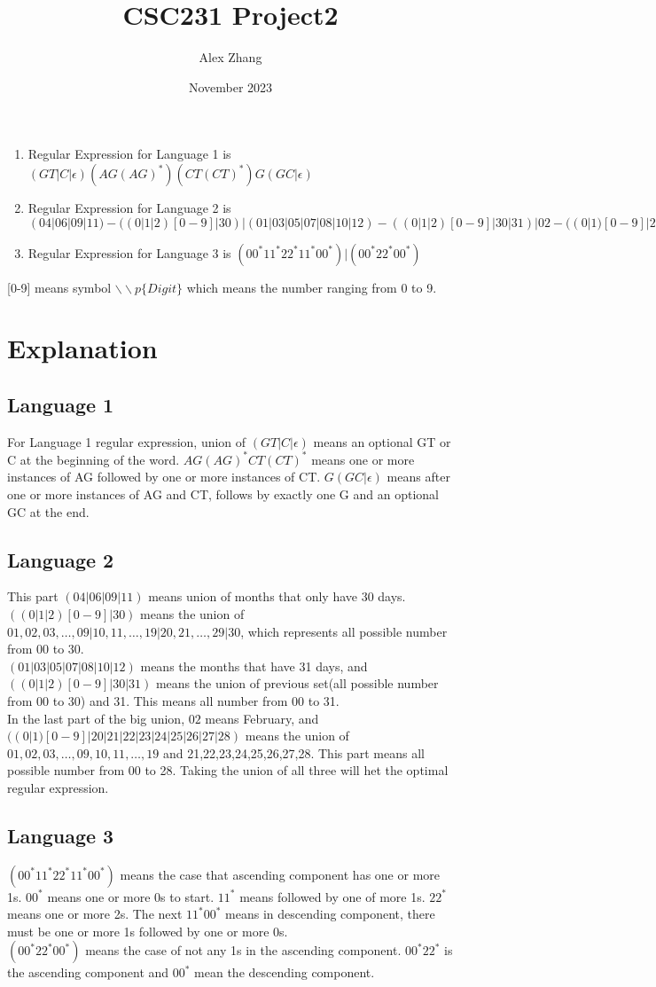 \documentclass{article}
\title{CSC231 Project2}
\author{Alex Zhang}
\date{November 2023}
\begin{document}
\maketitle
\begin{enumerate}
    \item Regular Expression for Language 1 is $(GT|C|\epsilon)(AG(AG)^*)(CT(CT)^*)G(GC|\epsilon)$
    \item Regular Expression for Language 2 is $(04|06|09|11)-((0|1|2)[0-9]|30)
    |(01|03|05|07|08|10|12)-((0|1|2)[0-9]|30|31)
    |02-((0|1)[0-9]|20|21|22|23|24|25|26|27|28)$
    \item Regular Expression for Language 3 is $(00^*11^*22^*11^*00^*)|(00^*22^*00^*)$
\end{enumerate}
[0-9] means symbol $\backslash\backslash p\{Digit\}$ which means the number ranging from 0 to 9.

\section*{Explanation}
\subsection*{Language 1}
For Language 1 regular expression, union of $(GT|C|\epsilon)$ means an optional GT or C at the beginning of the word.
$AG(AG)^*CT(CT)^*$ means one or more instances of AG followed by one or more instances of CT.
$G(GC|\epsilon)$ means after one or more instances of AG and CT, follows by exactly one G and an optional GC at the end.
\subsection*{Language 2}
This part $(04|06|09|11)$ means union of months that only have 30 days. 
$((0|1|2)[0-9]|30)$ means the union of ${01,02,03,\dots, 09} | {10,11,\dots ,19}| {20,21,\dots, 29}| 30$, which represents all possible number from 00 to 30.\\
$(01|03|05|07|08|10|12)$ means the months that have 31 days, and $((0|1|2)[0-9]|30|31)$ means the union of previous set(all possible number from 00 to 30) and 31.
This means all number from 00 to 31.\\
In the last part of the big union, $02$ means February, and $((0|1)[0-9]|20|21|22|23|24|25|26|27|28)$ means the union of ${01,02,03,\dots, 09},{10,11,\dots ,19} $ and 21,22,23,24,25,26,27,28.
This part means all possible number from 00 to 28.
Taking the union of all three will het the optimal regular expression.

\subsection*{Language 3}
$(00^*11^*22^*11^*00^*)$ means the case that ascending component has one or more 1s. 
$00^*$ means one or more 0s to start. 
$11^*$ means followed by one of more 1s.
$22^*$ means one or more 2s.
The next $11^*00^*$ means in descending component, there must be one or more 1s followed by one or more 0s.\\
$(00^*22^*00^*)$ means the case of not any 1s in the ascending component.
$00^*22^*$ is the ascending component and $00^*$ mean the descending component.

 
\end{document}
